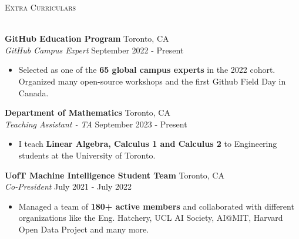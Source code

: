 \documentclass[a4paper]{article}
\newcommand{\lineunder} {
    \vspace*{-8pt} \\
    \hspace*{-18pt} \hrulefill \\
}
\newcommand{\header} [1] {
    {\hspace*{-18pt}\vspace*{6pt} \textsc{#1}}
    \vspace*{-6pt} \lineunder
}
\begin{document}

\header{Extra Curriculars}
\vspace{1mm}

\textbf{GitHub Education Program} \hfill Toronto, CA\\
\textit{GitHub Campus Expert} \hfill September 2022 - Present\\
\vspace{-3mm}
\begin{itemize} \itemsep 0.5pt
	\item Selected as one of the \textbf{65 global campus experts} in the 2022 cohort. Organized many open-source workshops and the first Github Field Day in Canada.
\end{itemize}

\textbf{Department of Mathematics} \hfill Toronto, CA\\
\textit{Teaching Assistant - TA} \hfill September 2023 - Present\\
\vspace{-3mm}
\begin{itemize} \itemsep 0.5pt
	\item I teach \textbf{Linear Algebra, Calculus 1 and Calculus 2} to Engineering students at the University of Toronto.
\end{itemize}

\textbf{UofT Machine Intelligence Student Team} \hfill Toronto, CA\\
\textit{Co-President} \hfill July 2021 - July 2022\\
\vspace{-3mm}
\begin{itemize} \itemsep 0.5pt
	\item Managed a team of \textbf{180+ active members} and collaborated with different organizations like the Eng. Hatchery, UCL AI Society, AI@MIT, Harvard Open Data Project and many more.
\end{itemize}
\end{document}
